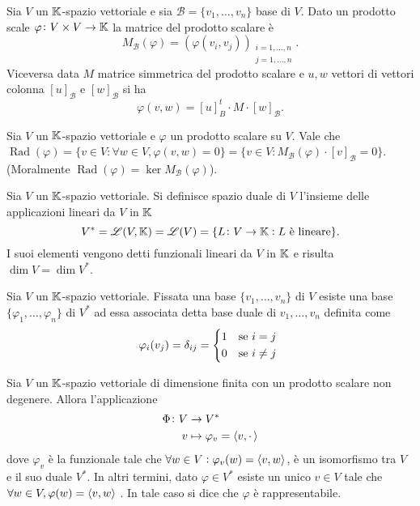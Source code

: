 \begin{thm}
	Sia $ V $ un $ \mathbb{K} $-spazio vettoriale e sia $ \mathscr{B} = \{v_1, \ldots, v_n\} $ base di $ V $. Dato un prodotto scale $ \varphi \colon V \times V \to \mathbb{K} $ la matrice del prodotto scalare è \[M_{\mathscr{B}}(\varphi) = (\varphi(v_i, v_j))_{\substack{i = 1, \ldots, n \\ j = 1, \ldots, n}}.\] Viceversa data $ M $ matrice simmetrica del prodotto scalare e $ u, w $ vettori di vettori colonna $ [u]_{\mathscr{B}} $ e $ [w]_{\mathscr{B}} $ si ha \[\varphi(v, w) = [u]_{B}^t \cdot M \cdot [w]_{\mathscr{B}}.\]
\end{thm}

\begin{prop}[radicale]
	Sia $ V $ un $ \mathbb{K} $-spazio vettoriale e $ \varphi $ un prodotto scalare su $ V $. Vale che $ \operatorname{Rad}{(\varphi)} = \{v \in V : \forall w \in V, \varphi(v, w) = 0\} = \{v \in V : M_{\mathscr{B}}(\varphi) \cdot [v]_{\mathscr{B}} = 0\} $.\\
	(Moralmente $ \operatorname{Rad}{(\varphi)} = \ker{M_{\mathscr{B}}(\varphi)} $). 
\end{prop}

\begin{definition}
	Sia $ V $ un $ \mathbb{K} $-spazio vettoriale. Si definisce spazio duale di $ V $ l'insieme delle applicazioni lineari da $ V $ in $ \mathbb{K} $ \[V^{*} = \mathscr{L}(V, \mathbb{K}) = \mathscr{L}(V) = \{L \colon V \to \mathbb{K} : L \text{ è lineare}\}.\] I suoi elementi vengono detti funzionali lineari da $ V $ in $ \mathbb{K} $ e risulta $ \dim{V} = \dim{V^{*}} $. 
\end{definition}

\begin{definition}
	Sia $ V $ un $ \mathbb{K} $-spazio vettoriale. Fissata una base $ \{v_1, \ldots, v_n\} $ di $ V $ esiste una base $ \{\varphi_1, \ldots, \varphi_n\} $ di $ V^{*} $ ad essa associata detta base duale di $ v_1, \ldots, v_n $ definita come 
	\[\varphi_i (v_j) = \delta_{ij} =  
	\begin{cases*}
	1 & se $ i = j $ \\
	0 & se $ i \neq j $ \\
	\end{cases*}\]
\end{definition}

\begin{thm}[di rappresentazione] \label{thm:isom_duale}
	Sia $ V $ un $ \mathbb{K} $-spazio vettoriale di dimensione finita con un prodotto scalare non degenere. Allora l'applicazione
	\begin{align*}
	\Phi \colon V & \to V^{*} \\
	v & \mapsto \varphi_v = \langle v, \cdot \, \rangle
	\end{align*}
	dove $ \varphi_v $ è la funzionale tale che $ \forall w \in V : \varphi_v(w) = \langle v, w \rangle $, è un isomorfismo tra $ V $ e il suo duale $ V^{*} $. In altri termini, dato $ \varphi \in V^{*} $ esiste un unico $ v \in V $ tale che $ \forall w \in V, \varphi{(w)} = \langle v, w \rangle $ . In tale caso si dice che $ \varphi $ è rappresentabile.
\end{thm}


